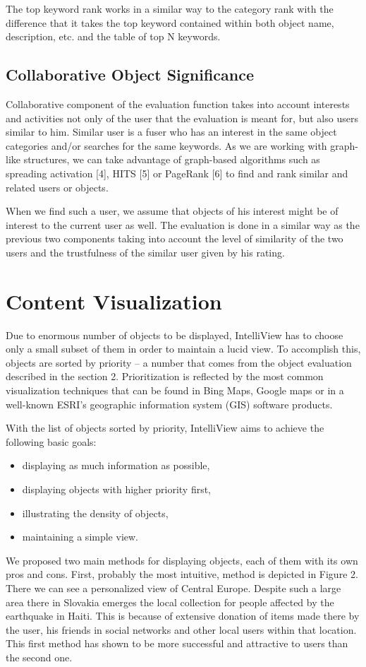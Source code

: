 \documentclass{llncs}
\begin{document}
The top keyword rank works in a similar way to the category rank with the difference that it takes the top keyword contained within both object name, description, etc. and the table of top N keywords.

\subsection{Collaborative Object Significance}
Collaborative component of the evaluation function takes into account interests and activities not only of the user that the evaluation is meant for, but also users similar to him. Similar user is a fuser who has an interest in the same object categories and/or searches for the same keywords. As we are working with graph-like structures, we can take advantage of graph-based algorithms such as spreading activation [4], HITS [5] or PageRank [6] to find and rank similar and related users or objects.

When we find such a user, we assume that objects of his interest might be of interest to the current user as well. The evaluation is done in a similar way as the previous two components taking into account the level of similarity of the two users and the trustfulness of the similar user given by his rating.

\section{Content Visualization}
Due to enormous number of objects to be displayed, IntelliView has to choose only a small subset of them in order to maintain a lucid view. To accomplish this, objects are sorted by priority – a number that comes from the object evaluation described in the section 2. Prioritization is reflected by the most common visualization techniques that can be found in Bing Maps, Google maps or in a well-known ESRI’s geographic information system (GIS) software products.

With the list of objects sorted by priority, IntelliView aims to achieve the following basic goals:

\begin{itemize}
   \item displaying as much information as possible, 
   \item displaying objects with higher priority first, 
   \item illustrating the density of objects,
	 \item maintaining a simple view.
\end{itemize}
We proposed two main methods for displaying objects, each of them with its own pros and cons. First, probably the most intuitive, method is depicted in Figure 2. There we can see a personalized view of Central Europe. Despite such a large area there in Slovakia emerges the local collection for people affected by the earthquake in Haiti. This is because of extensive donation of items made there by the user, his friends in social networks and other local users within that location. This first method has shown to be more successful and attractive to users than the second one.
\end{document}
